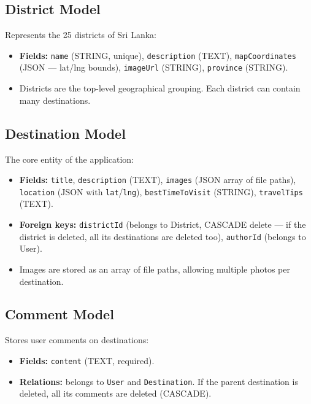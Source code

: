 \documentclass[12pt,a4paper]{report}
\begin{document}
\subsection{District Model}

Represents the 25 districts of Sri Lanka:

\begin{itemize}[leftmargin=2em]
  \item \textbf{Fields:} \texttt{name} (STRING, unique), \texttt{description} (TEXT), \texttt{mapCoordinates} (JSON --- lat/lng bounds), \texttt{imageUrl} (STRING), \texttt{province} (STRING).
  \item Districts are the top-level geographical grouping. Each district can contain many destinations.
\end{itemize}

\subsection{Destination Model}

The core entity of the application:

\begin{itemize}[leftmargin=2em]
  \item \textbf{Fields:} \texttt{title}, \texttt{description} (TEXT), \texttt{images} (JSON array of file paths), \texttt{location} (JSON with \texttt{lat}/\texttt{lng}), \texttt{bestTimeToVisit} (STRING), \texttt{travelTips} (TEXT).
  \item \textbf{Foreign keys:} \texttt{districtId} (belongs to District, CASCADE delete --- if the district is deleted, all its destinations are deleted too), \texttt{authorId} (belongs to User).
  \item Images are stored as an array of file paths, allowing multiple photos per destination.
\end{itemize}

\subsection{Comment Model}

Stores user comments on destinations:

\begin{itemize}[leftmargin=2em]
  \item \textbf{Fields:} \texttt{content} (TEXT, required).
  \item \textbf{Relations:} belongs to \texttt{User} and \texttt{Destination}. If the parent destination is deleted, all its comments are deleted (CASCADE).
\end{itemize}
\end{document}
